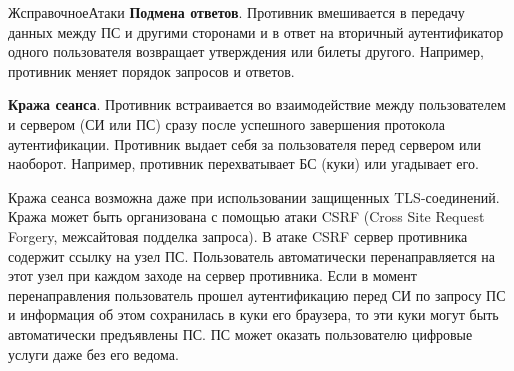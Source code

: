 \begin{appendix}{Ж}{справочное}{Атаки}
{\bf Подмена ответов}.
Противник вмешивается в передачу данных между ПС и другими сторонами 
и в ответ на вторичный аутентификатор одного пользователя
возвращает утверждения или билеты другого.
%
Например, противник меняет порядок запросов и ответов.


{\bf Кража сеанса}. 
Противник встраивается во взаимодействие между пользователем 
и сервером (СИ или ПС) сразу после успешного завершения протокола 
аутентификации. Противник выдает себя за пользователя перед сервером 
или наоборот. 
%
Например, противник перехватывает БС (куки) или угадывает его. 


\begin{note*}
Кража сеанса возможна даже при использовании защищенных TLS-соединений. 
Кража может быть организована с помощью атаки CSRF (Cross Site Request 
Forgery, межсайтовая подделка запроса). В атаке CSRF сервер противника 
содержит ссылку на узел ПС. Пользователь автоматически перенаправляется 
на этот узел при каждом заходе на сервер противника. 
Если в момент перенаправления пользователь прошел аутентификацию
перед СИ по запросу ПС и информация об этом сохранилась в куки его браузера,
то эти куки могут быть автоматически предъявлены ПС.
%
ПС может оказать пользователю цифровые услуги даже без его ведома.
%
\end{note*}

\end{appendix}